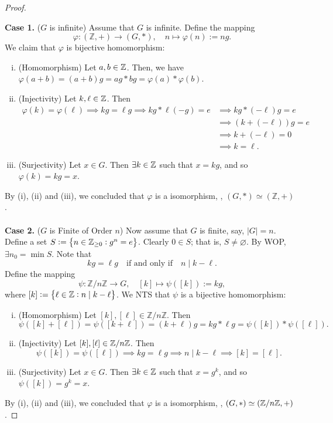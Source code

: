 \documentclass[11pt,openany]{article}
\begin{document}
\begin{proof}
\begin{center}
\end{center}
	\textbf{Case 1.}\; ($G$ is infinite) Assume that $G$ is infinite. Define the mapping \[
\varphi : (\mathbb{Z}, +) \to (G, \ast),\quad n\mapsto \varphi(n):=ng.
\] We claim that $\varphi$ is bijective homomorphism: \begin{enumerate}[(i)]
	\item (Homomorphism)\;  Let $a,b\in\mathbb{Z}$. Then, we have $
	\varphi(a+b)=(a+b)g=ag\ast bg = \varphi(a)\ast\varphi(b)$.
	\item (Injectivity)\; Let $k,\ell\in\mathbb{Z}$. Then \begin{align*}
		\varphi(k)=\varphi(\ell)\implies kg=\ell g\implies kg\ast \ell(-g)=e
		&\implies kg\ast (-\ell)g=e\\
		&\implies (k+(-\ell))g=e\\
		&\implies k+(-\ell) = 0 \\
		&\implies k=\ell.
	\end{align*}
	\item (Surjectivity)\; Let \(x\in G\). Then $\exists k\in \mathbb{Z}$ such that \(x=kg\), and so $\varphi(k)=kg = x$.
\end{enumerate}
By (i), (ii) and (iii), we concluded that \(\varphi\) is a isomorphism, \ie, $(G,\ast) \simeq (\mathbb{Z},+)$.\ \\
\ \\
\noindent
\textbf{Case 2.}\; (\(G\) is Finite of Order \(n\))\; Now assume that \(G\) is finite, say, \(|G|=n\). Define a set $S:=\set{n\in\mathbb{Z}_{\geq 0}: g^n=e}$. Clearly $0\in S$; that is, $S\neq\varnothing$. By WOP, $\exists n_0=\min S$. Note that \[
kg = \ell g \quad \text{if and only if} \quad n\mid k-\ell.
\]Define the mapping\[
\psi: \mathbb{Z}/n\mathbb{Z} \to G,\quad [k]\mapsto \psi([k]):=kg,
\] where $[k]:=\set{\ell\in\mathbb{Z}:n\mid k-\ell }$. We NTS that \(\psi\) is a bijective homomorphism:
\begin{enumerate}[(i)]
	\item (Homomorphism)\; Let \([k],[\ell]\in \mathbb{Z}/n\mathbb{Z}\). Then \[
	\psi([k]+[\ell]) = \psi([k+\ell]) = (k+\ell)g = kg \ast \ell g = \psi([k]) \ast \psi([\ell]).
	\]
	\item (Injectivity)\; Let $[k],[\ell]\in\mathbb{Z}/n\mathbb{Z}$. Then \[
	\psi([k])=\psi([\ell])\implies kg=\ell g\implies n\mid k-\ell \implies [k]=[\ell].
	\]
	\item (Surjectivity)\; Let \(x\in G\). Then $\exists k\in \mathbb{Z}$ such that \(x=g^k\), and so $\psi([k])=g^k = x$.
\end{enumerate}
By (i), (ii) and (iii), we concluded that \(\varphi\) is a isomorphism, \ie, $(G,\ast) \simeq (\mathbb{Z}/n\mathbb{Z},+)$.
\end{proof}
\end{document}
